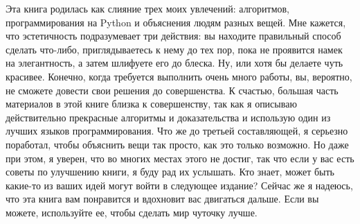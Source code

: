 Эта книга родилась как слияние трех моих увлечений: алгоритмов, программирования на Python и объяснения людям разных вещей. Мне кажется, что эстетичность подразумевает три действия: вы находите правильный способ сделать что-либо, приглядываетесь к нему до тех пор, пока не проявится намек на элегантность, а затем шлифуете его до блеска. Ну, или хотя бы делаете чуть красивее. Конечно, когда требуется выполнить очень много работы, вы, вероятно, не сможете довести свои решения до совершенства. К счастью, большая часть материалов в этой книге близка к совершенству, так как я описываю действительно прекрасные алгоритмы и доказательства и использую один из лучших языков программирования. Что же до третьей составляющей, я серьезно поработал, чтобы объяснить вещи так просто, как это только возможно. Но даже при этом, я уверен, что во многих местах этого не достиг, так что если у вас есть советы по улучшению книги, я буду рад их услышать. Кто знает, может быть какие-то из ваших идей могут войти в следующее издание? Сейчас же я надеюсь, что эта книга вам понравится и вдохновит вас двигаться дальше. Если вы можете, используйте ее, чтобы сделать мир чуточку лучше.
